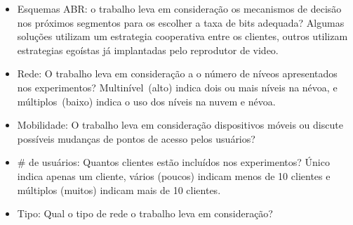 \begin{itemize}

\item Esquemas ABR: o trabalho leva em consideração os mecanismos de decisão nos próximos segmentos para os escolher a taxa de bits adequada? Algumas soluções utilizam um estrategia cooperativa entre os clientes, outros utilizam estrategias egoístas já implantadas pelo reprodutor de video.

\item Rede: O trabalho leva em consideração a o número de níveos apresentados nos experimentos? Multinível~(alto) indica dois ou mais níveis na névoa, e múltiplos~(baixo) indica o uso dos níveis na nuvem e névoa.

\item Mobilidade: O trabalho leva em consideração dispositivos móveis ou discute possíveis mudanças de pontos de acesso pelos usuários?

\item \# de usuários: Quantos clientes estão incluídos nos experimentos? Único indica apenas um cliente, vários (poucos) indicam menos de 10 clientes e múltiplos (muitos) indicam mais de 10 clientes.

\item Tipo: Qual o tipo de rede o trabalho leva em consideração?

\end{itemize}

